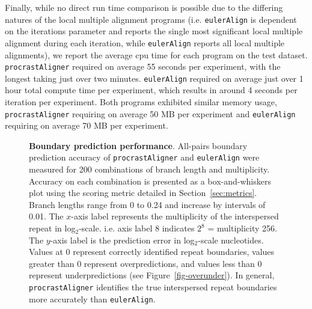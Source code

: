 \documentclass{llncs}
\begin{document}
Finally, while no direct run time comparison is possible due to the differing natures of the local multiple alignment programs (i.e. \texttt{eulerAlign} is dependent on the iterations parameter and reports the single most significant local multiple alignment during each iteration, while \texttt{eulerAlign} reports all local multiple alignments), we report the average cpu time for each program on the test dataset. \texttt{procrastAligner} required on average 55 seconds per experiment, with the longest taking just over two minutes. \texttt{eulerAlign} required on average just over 1 hour total compute time per experiment, which results in around 4 seconds per iteration per experiment. Both programs exhibited similar memory usage, \texttt{procrastAligner} requiring on average 50 MB per experiment and \texttt{eulerAlign} requiring on average 70 MB per experiment.

\begin{figure}[t!]
\centering
{}
\caption{\textbf{Boundary prediction performance}. All-pairs boundary prediction accuracy of \texttt{procrastAligner} and \texttt{eulerAlign} were measured for 200 combinations of branch length and multiplicity.  Accuracy on each combination is presented as a box-and-whiskers plot using the scoring metric detailed in Section~\ref{sec:metrics}.  Branch lengths range from 0 to 0.24 and increase by intervals of 0.01.  The $x$-axis label represents the multiplicity of the interspersed repeat in log$_2$-scale. i.e. axis label 8 indicates $2^{8}$ = multiplicity 256. The $y$-axis label is the prediction error in log$_2$-scale nucleotides. Values at 0 represent correctly identified repeat boundaries, values greater than 0 represent overpredictions, and values less than 0 represent underpredictions (see Figure~\ref{fig-overunder}). In general, \texttt{procrastAligner} identifies the true interspersed repeat boundaries more accurately than \texttt{eulerAlign}.}
\label{fig-boundary}
\end{figure}
\end{document}
